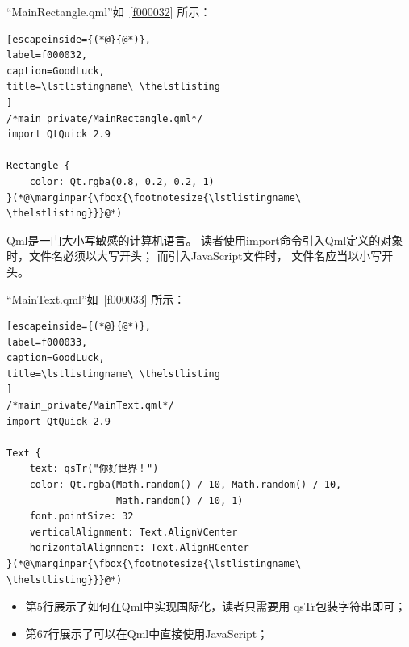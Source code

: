 “MainRectangle.qml”如\lstlistingname\ \ref{f000032}
所示：
\FloatBarrier
\begin{lstlisting}[escapeinside={(*@}{@*)},
label=f000032,
caption=GoodLuck,
title=\lstlistingname\ \thelstlisting
]
/*main_private/MainRectangle.qml*/
import QtQuick 2.9

Rectangle {
    color: Qt.rgba(0.8, 0.2, 0.2, 1)
}(*@\marginpar{\fbox{\footnotesize{\lstlistingname\ \thelstlisting}}}@*)\end{lstlisting}          %

Qml是一门大小写敏感的计算机语言。
读者使用import命令引入Qml定义的对象时，文件名必须以大写开头；
而引入JavaScript文件时，
文件名应当以小写开头。

“MainText.qml”如\lstlistingname\ \ref{f000033}
所示：

\FloatBarrier
\begin{lstlisting}[escapeinside={(*@}{@*)},
label=f000033,
caption=GoodLuck,
title=\lstlistingname\ \thelstlisting
]
/*main_private/MainText.qml*/
import QtQuick 2.9

Text {
    text: qsTr("你好世界！")
    color: Qt.rgba(Math.random() / 10, Math.random() / 10,
                   Math.random() / 10, 1)
    font.pointSize: 32
    verticalAlignment: Text.AlignVCenter
    horizontalAlignment: Text.AlignHCenter
}(*@\marginpar{\fbox{\footnotesize{\lstlistingname\ \thelstlisting}}}@*)\end{lstlisting}          %

\begin{itemize}

\item 第5行展示了如何在Qml中实现国际化，读者只需要用
qsTr包装字符串即可；
\item 第6\raisebox{0.16ex}{\sourcefonttwo\~{}}7行展示了可以在Qml中直接使用JavaScript；


\end{itemize}













